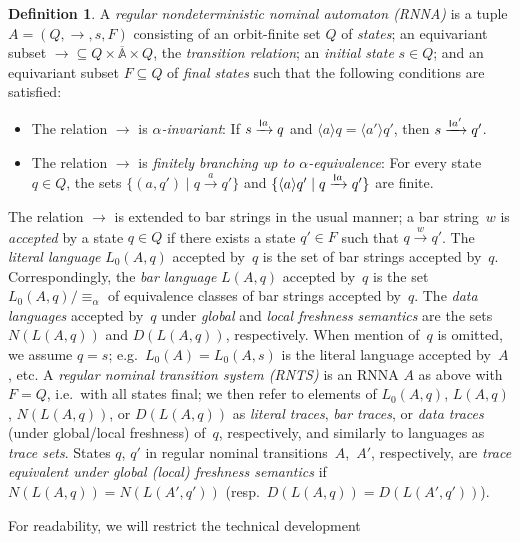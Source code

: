 \documentclass[11pt,a4paper]{amsart}
\newcommand{\Names}{\mathbb{A}}
\newcommand{\barNames}{\overline{\Names}}
\newcommand{\alphaeq}{\equiv_\alpha}
\newcommand{\bind}[1]{\langle #1\rangle}
\theoremstyle{plain}
\newcommand{\scriptmidmid}{\hspace{0.2ex}{\rule[-0.1ex]{0.6pt}{1.1ex}}\hspace{0.2ex}}
\newcommand{\scriptnew}[1]{{\scriptmidmid}#1}
\numberwithin{equation}{section}
\newcommand{\+}[1]{\mathcal{#1}\xspace}
\theoremstyle{definition}
\newtheorem{defn}[defn]{Definition}
\begin{document}
\begin{defn}
  A \emph{regular nondeterministic nominal automaton (RNNA)} is a
  tuple \(A=(Q, \to, s, F)\) consisting of an orbit-finite set \(Q\)
  of \emph{states}; an equivariant subset
  \({\to} \subseteq Q \times \barNames \times Q\), the
  \emph{transition relation}; an \emph{initial state} \(s \in Q\); and
  an equivariant subset \(F \subseteq Q\) of \emph{final states} such
  that the following conditions are satisfied:
    \begin{itemize}
    \item The relation \(\to\) is \emph{$\alpha$-invariant}: If
      \(s \xrightarrow{\scriptnew a} q\) and
      \(\bind aq = \bind{a'}q'\), then
      \(s \xrightarrow{\scriptnew a'} q'\).
    \item The relation \(\to\) is \emph{finitely branching up to
        $\alpha$-equivalence}: For every state \(q \in Q\), the sets
      \(\{(a, q') \mid q \xrightarrow{a} q'\}\) and
      \(\{\bind aq' \mid q \xrightarrow{\scriptnew a} q'\}\) are
      finite.
    \end{itemize}
    The relation \(\to\) is extended to bar strings in the usual
    manner; a bar string~$w$ is \emph{accepted} by a state $q\in Q$ if
    there exists a state $q'\in F$ such that $q\xrightarrow{w}
    q'$. The \emph{literal language} $L_0(A,q)$ accepted by~$q$ is the
    set of bar strings accepted by~$q$. Correspondingly, the \emph{bar
      language} $L(A,q)$ accepted by~$q$ is the
    set~$L_0(A,q)/{\alphaeq}$ of equivalence classes of bar strings
    accepted by~$q$. The \emph{data languages} accepted by~$q$ under
    \emph{global} and \emph{local freshness semantics} are the sets
    $N(L(A,q))$ and $D(L(A,q))$, respectively. When mention of~$q$ is
    omitted, we assume $q=s$; e.g.\ $L_0(A)=L_0(A,s)$ is the literal
    language accepted by~$A$, etc. A \emph{regular nominal transition
      system (RNTS)} is an RNNA $A$ as above with $F=Q$, i.e.~with all
    states final; we then refer to elements of $L_0(A,q)$, $L(A,q)$,
    $N(L(A,q))$, or $D(L(A,q))$ as \emph{literal traces}, \emph{bar
      traces}, or \emph{data traces} (under global/local freshness)
    of~$q$, respectively, and similarly to languages as \emph{trace
      sets}. States $q$, $q'$ in regular nominal
    transitions~$A$,~$A'$, respectively, are \emph{trace equivalent
      under global (local) freshness semantics} if
    $N(L(A,q))=N(L(A',q'))$ (resp.~$D(L(A,q))=D(L(A',q'))$).
\end{defn}
\noindent For readability, we will restrict the technical development
\end{document}
